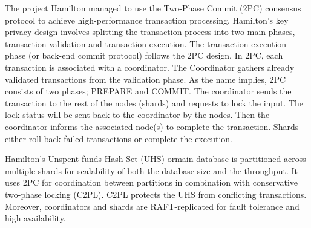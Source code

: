 \documentclass[
  english,        %
  font=times,     %
  onecolumn,      %
]{tumarticle}
\begin{document}
\hspace{1em} The project Hamilton \cite{lovejoy2023hamilton}  managed to use the Two-Phase Commit (2PC) consensus protocol to achieve high-performance transaction processing. Hamilton's key privacy design involves splitting the transaction process into two main phases, transaction validation and transaction execution. The transaction execution phase (or back-end commit protocol) follows the 2PC design. In 2PC, each transaction is associated with a coordinator. The Coordinator gathers already validated transactions from the validation phase. As the name implies, 2PC consists of two phases; PREPARE and COMMIT. The coordinator sends the transaction to the rest of the nodes (shards) and requests to lock the input. The lock status will be sent back to the coordinator by the nodes. Then the coordinator informs the associated node(s) to complete the transaction. Shards either roll back failed transactions or complete the execution.  

\hspace{1em} Hamilton’s Unspent funds Hash Set (UHS) ormain database is partitioned across multiple shards for scalability of both the database size and the throughput. It uses 2PC for coordination between partitions in combination with conservative two-phase locking (C2PL). C2PL protects the UHS from conflicting transactions. Moreover, coordinators and shards are RAFT-replicated for fault tolerance and high availability.
\end{document}
